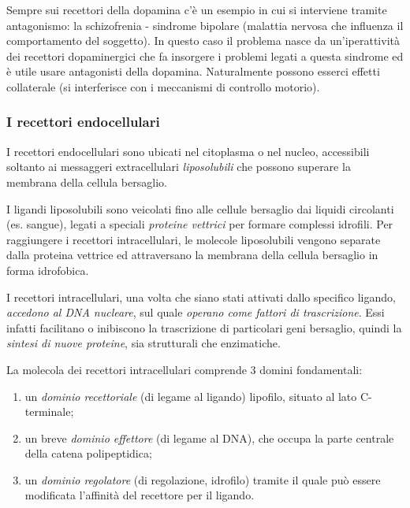 \documentclass[]{article}
\begin{document}
Sempre sui recettori della dopamina c'è un esempio in cui si interviene
tramite antagonismo: la schizofrenia - sindrome bipolare (malattia
nervosa che influenza il comportamento del soggetto). In questo caso il
problema nasce da un'iperattività dei recettori dopaminergici che fa
insorgere i problemi legati a questa sindrome ed è utile usare
antagonisti della dopamina. Naturalmente possono esserci effetti
collaterale (si interferisce con i meccanismi di controllo motorio).

\subsubsection{I recettori
endocellulari}\label{i-recettori-endocellulari}

I recettori endocellulari sono ubicati nel citoplasma o nel nucleo,
accessibili soltanto ai messaggeri extracellulari \emph{liposolubili}
che possono superare la membrana della cellula bersaglio.

I ligandi liposolubili sono veicolati fino alle cellule bersaglio dai
liquidi circolanti (es. sangue), legati a speciali \emph{proteine
vettrici} per formare complessi idrofili. Per raggiungere i recettori
intracellulari, le molecole liposolubili vengono separate dalla proteina
vettrice ed attraversano la membrana della cellula bersaglio in forma
idrofobica.

I recettori intracellulari, una volta che siano stati attivati dallo
specifico ligando, \emph{accedono al DNA nucleare}, sul quale
\emph{operano come fattori di trascrizione}. Essi infatti facilitano o
inibiscono la trascrizione di particolari geni bersaglio, quindi la
\emph{sintesi di nuove proteine}, sia strutturali che enzimatiche.

La molecola dei recettori intracellulari comprende 3 domini
fondamentali:

\begin{enumerate}
\def\labelenumi{\arabic{enumi}.}
\itemsep1pt\parskip0pt
\item
  un \emph{dominio recettoriale} (di legame al ligando) lipofilo,
  situato al lato C-terminale;
\item
  un breve \emph{dominio effettore} (di legame al DNA), che occupa la
  parte centrale della catena polipeptidica;
\item
  un \emph{dominio regolatore} (di regolazione, idrofilo) tramite il
  quale può essere modificata l'affinità del recettore per il ligando.
\end{enumerate}
\end{document}
